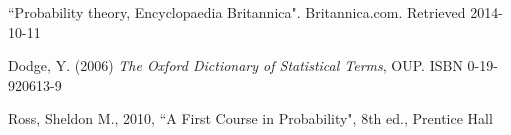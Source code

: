 \documentclass[a4paper,twocolumn]{article}
\begin{document}
\begin{thebibliography}{9}
         ``Probability theory, Encyclopaedia Britannica".
         Britannica.com.
         Retrieved 2014-10-11

        Dodge, Y. (2006)
        \textit{The Oxford Dictionary of Statistical Terms}, OUP.
        ISBN 0-19-920613-9

        Ross, Sheldon M.,
        2010,
        ``A First Course in Probability", 8th ed.,
        Prentice Hall
\end{thebibliography}
\end{document}
